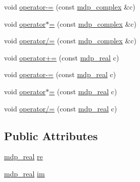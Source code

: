 \begin{DoxyCompactItemize}
\item 
void \hyperlink{classmdp__complex_a1eac5dee207c0bb4cfafa7f02311e819}{operator-\/=} (const \hyperlink{classmdp__complex}{mdp\+\_\+complex} \&c)
\item 
void \hyperlink{classmdp__complex_a66c98af6209f0a424413f08f75626b61}{operator$\ast$=} (const \hyperlink{classmdp__complex}{mdp\+\_\+complex} \&c)
\item 
void \hyperlink{classmdp__complex_a0dc8af0f39405418b2dacde050e10e5f}{operator/=} (const \hyperlink{classmdp__complex}{mdp\+\_\+complex} \&c)
\item 
void \hyperlink{classmdp__complex_aead1214077dc876c3f674e5fcd9717a5}{operator+=} (const \hyperlink{mdp__global__vars_8h_a69d96b74c791e0bbdb888b3913a69450}{mdp\+\_\+real} c)
\item 
void \hyperlink{classmdp__complex_a5388821dab285a814eef49281c3a69e4}{operator-\/=} (const \hyperlink{mdp__global__vars_8h_a69d96b74c791e0bbdb888b3913a69450}{mdp\+\_\+real} c)
\item 
void \hyperlink{classmdp__complex_af073e0a4d5e1dd7495797b42312d35cb}{operator$\ast$=} (const \hyperlink{mdp__global__vars_8h_a69d96b74c791e0bbdb888b3913a69450}{mdp\+\_\+real} c)
\item 
void \hyperlink{classmdp__complex_aa040dd29ac7484eb770f940a4761c435}{operator/=} (const \hyperlink{mdp__global__vars_8h_a69d96b74c791e0bbdb888b3913a69450}{mdp\+\_\+real} c)
\end{DoxyCompactItemize}
\subsection*{Public Attributes}
\begin{DoxyCompactItemize}
\item 
\hyperlink{mdp__global__vars_8h_a69d96b74c791e0bbdb888b3913a69450}{mdp\+\_\+real} \hyperlink{classmdp__complex_abd6f1624347c6acca19f089047c1a995}{re}
\item 
\hyperlink{mdp__global__vars_8h_a69d96b74c791e0bbdb888b3913a69450}{mdp\+\_\+real} \hyperlink{classmdp__complex_ab1d9712d92fea8db3d65ccfdee49adaa}{im}
\end{DoxyCompactItemize}
